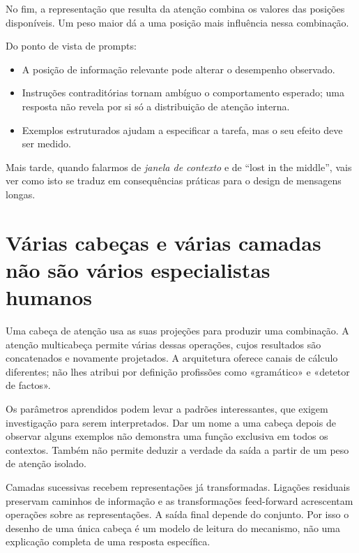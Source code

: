 No fim, a representação que resulta da atenção combina os valores das posições disponíveis. Um peso maior dá a uma posição mais influência nessa combinação.

Do ponto de vista de prompts:

\begin{itemize}[leftmargin=*]
\item A posição de informação relevante pode alterar o desempenho observado.
\item Instruções contraditórias tornam ambíguo o comportamento esperado; uma resposta não revela por si só a distribuição de atenção interna.
\item Exemplos estruturados ajudam a especificar a tarefa, mas o seu efeito deve ser medido.
\end{itemize}

Mais tarde, quando falarmos de \emph{janela de contexto} e de “lost in the middle”, vais ver como isto se traduz em consequências práticas para o design de mensagens longas.

\section{Várias cabeças e várias camadas não são vários especialistas humanos}
Uma cabeça de atenção usa as suas projeções para produzir uma combinação. A atenção multicabeça permite várias dessas operações, cujos resultados são concatenados e novamente projetados. A arquitetura oferece canais de cálculo diferentes; não lhes atribui por definição profissões como «gramático» e «detetor de factos».

Os parâmetros aprendidos podem levar a padrões interessantes, que exigem investigação para serem interpretados. Dar um nome a uma cabeça depois de observar alguns exemplos não demonstra uma função exclusiva em todos os contextos. Também não permite deduzir a verdade da saída a partir de um peso de atenção isolado.

Camadas sucessivas recebem representações já transformadas. Ligações residuais preservam caminhos de informação e as transformações feed-forward acrescentam operações sobre as representações. A saída final depende do conjunto. Por isso o desenho de uma única cabeça é um modelo de leitura do mecanismo, não uma explicação completa de uma resposta específica.

